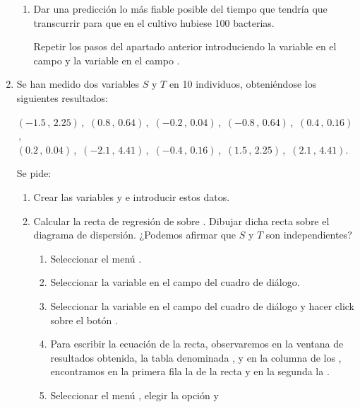 \begin{enumerate}[leftmargin=*]
\begin{enumerate}
\item Dar una predicción lo más fiable posible del tiempo que tendría 
que transcurrir para que en el cultivo hubiese 100 bacterias.
\begin{indicacion}
Repetir los pasos del apartado anterior introduciendo la variable 
 en el campo  y
la variable  en el campo 
.
\end{indicacion}
\end{enumerate}

\item Se han medido dos variables $S$ y $T$ en 10 individuos, 
obteniéndose los siguientes resultados:
\begin{center}
$(-1.5 \,,\, 2.25)$\,,\, $(0.8 \,,\, 0.64)$\,,\, $(-0.2 \,,\, 0.04)$\,,\, $(-0.8 \,,\, 0.64)$\,,\, $(0.4 \,,\, 0.16)$\,,\,\\
$(0.2 \,,\, 0.04)$\,,\, $(-2.1 \,,\, 4.41)$\,,\, $(-0.4 \,,\, 0.16)$\,,\, $(1.5 \,,\, 2.25)$\,,\, $(2.1 \,,\, 4.41)$.
\end{center}
Se pide:
\begin{enumerate}
\item  Crear las variables  y  e introducir estos datos.
\item Calcular la recta de regresión de  sobre . 
Dibujar dicha recta sobre el diagrama de dispersión. ¿Podemos afirmar 
que $S$ y $T$ son independientes?
\begin{indicacion}
\begin{enumerate}
\item Seleccionar el menú .
\item Seleccionar la variable  en el campo 
 del cuadro de diálogo.
\item Seleccionar la variable  en el campo 
 del cuadro de diálogo y hacer click sobre
el botón .
\item Para escribir la ecuación de la recta, observaremos en la ventana 
de resultados obtenida, la tabla denominada
, y en la columna  de los 
, encontramos en la primera 
fila la  de la recta y en la segunda 
la .
\item Seleccionar el menú , elegir la opción  y  

\end{enumerate}
\end{indicacion}
\end{enumerate}
\end{enumerate}
